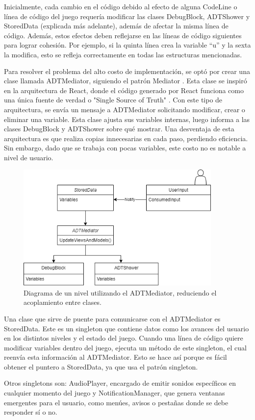 Inicialmente, cada cambio en el código debido al efecto de alguna CodeLine o línea de código del juego requería modificar las clases DebugBlock, ADTShower y StoredData (explicada más adelante), además de afectar la misma línea de código. Además, estos efectos deben reflejarse en las líneas de código siguientes para lograr cohesión. Por ejemplo, si la quinta línea crea la variable ``u'' y la sexta la modifica, esto se refleja correctamente en todas las estructuras mencionadas.

Para resolver el problema del alto costo de implementación, se optó por crear una clase llamada ADTMediator, siguiendo el patrón Mediator \cite{Freeman2015TheMP}. Esta clase se inspiró en la arquitectura de React, donde el código generado por React funciona como una única fuente de verdad o "Single Source of Truth" \cite{ReactSingleSourceOfTruth}. Con este tipo de arquitectura, se envía un mensaje a ADTMediator solicitando modificar, crear o eliminar una variable. Esta clase ajusta sus variables internas, luego informa a las clases DebugBlock y ADTShower sobre qué mostrar. Una desventaja de esta arquitectura es que realiza copias innecesarias en cada paso, perdiendo eficiencia. Sin embargo, dado que se trabaja con pocas variables, este costo no es notable a nivel de usuario.


\begin{figure}[h!]
	\centering
	\includegraphics[width=0.9\textwidth]{imagenes/ArquitecturaMediatorAfter.png}
	\caption{Diagrama de un nivel utilizando el ADTMediator, reduciendo el acoplamiento entre clases.}
	\label{ArquitecturaMediatorAfter}
\end{figure}

Una clase que sirve de puente para comunicarse con el ADTMediator es StoredData. Este es un singleton que contiene datos como los avances del usuario en los distintos niveles y el estado del juego. Cuando una línea de código quiere modificar variables dentro del juego, ejecuta un método de este singleton, el cual reenvía esta información al ADTMediator. Esto se hace así porque es fácil obtener el puntero a StoredData, ya que usa el patrón singleton.

Otros singletons son: AudioPlayer, encargado de emitir sonidos específicos en cualquier momento del juego y NotificationManager, que genera ventanas emergentes para el usuario, como menúes, avisos o pestañas donde se debe responder sí o no.